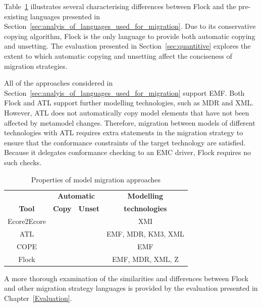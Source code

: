 Table~\ref{tab:differences} illustrates several characterising differences between Flock and the pre-existing languages presented in Section~\ref{sec:analyis_of_languages_used_for_migration}. Due to its conservative copying algorithm, Flock is the only language to provide both automatic copying and unsetting. The evaluation presented in Section~\ref{sec:quantitive} explores the extent to which automatic copying and unsetting affect the conciseness of migration strategies.

All of the approaches considered in Section~\ref{sec:analyis_of_languages_used_for_migration} support EMF. Both Flock and ATL support further modelling technologies, such as MDR and XML. However, ATL does not automatically copy model elements that have not been affected by metamodel changes. Therefore, migration between models of different technologies with ATL requires extra statements in the migration strategy to ensure that the conformance constraints of the target technology are satisfied. Because it delegates conformance checking to an EMC driver, Flock requires no such checks.

\begin{table}[tbp]
	\centering
	\begin{tabular}{|c|c|c|c|}
		\hline
		             & \multicolumn{2}{c|}{\textbf{Automatic}} & \textbf{Modelling} \\
		\textbf{Tool}& \textbf{Copy} & \textbf{Unset}          & \textbf{technologies} \\
		\hline
		Ecore2Ecore  & \tick             & \cross              & XMI                    \\
		\hline
		ATL          & \cross            & \tick               & EMF, MDR, KM3, XML     \\
		\hline
		COPE         & \tick             & \cross              & EMF                    \\
		\hline
		Flock        & \tick             & \tick               & EMF, MDR, XML, Z       \\
		\hline
	\end{tabular}
	\caption{Properties of model migration approaches}
	\label{tab:differences}
\end{table}

A more thorough examination of the similarities and differences between Flock and other migration strategy languages is provided by the evaluation presented in Chapter~\ref{Evaluation}.
